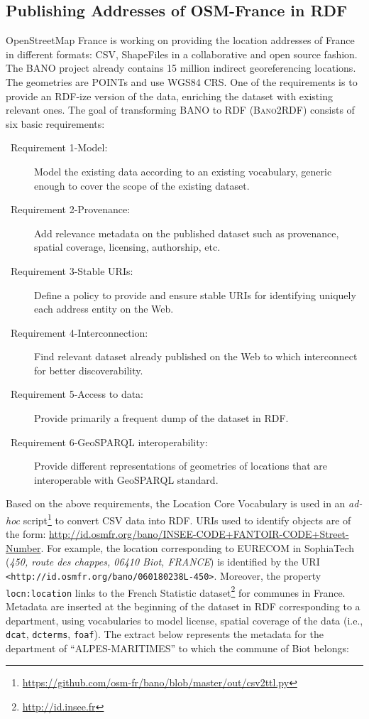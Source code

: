 \subsection{Publishing Addresses of OSM-France in RDF}
\label{sec:bano2rdf}
OpenStreetMap France is working on providing the location addresses of France in different formats: CSV, ShapeFiles in a collaborative and open source fashion. The BANO project already contains  15 million indirect georeferencing locations. The geometries are POINTs and use WGS84 CRS. One of the requirements is to provide an RDF-ize version of the data, enriching the dataset with existing relevant ones. The goal of transforming BANO to RDF (\textsc{Bano2RDF}) consists of six basic requirements:
\begin{description}
\item [~Requirement 1-Model:] Model the existing data according to an existing vocabulary, generic enough to cover the scope of the existing dataset.
\item[~Requirement 2-Provenance:] Add relevance metadata on the published dataset  such as provenance, spatial coverage, licensing, authorship, etc.
\item[~Requirement 3-Stable URIs:] Define a policy to provide and ensure stable URIs for identifying uniquely each address entity on the Web.
\item[~Requirement 4-Interconnection:] Find relevant dataset already published on the Web to which interconnect for better discoverability.

\item[~Requirement 5-Access to data:] Provide primarily a frequent dump of the dataset in RDF.

\item[~Requirement 6-GeoSPARQL interoperability:] Provide different representations of geometries of locations that are interoperable with GeoSPARQL standard.

\end{description}

Based on the above requirements, the Location Core Vocabulary \cite{locnvocab} is used in an \textit{ad-hoc} script\footnote{\url{https://github.com/osm-fr/bano/blob/master/out/csv2ttl.py}} to convert CSV data into RDF. URIs used to identify objects are of the form: \url{http://id.osmfr.org/bano/INSEE-CODE+FANTOIR-CODE+Street-Number}. For example, the location corresponding to EURECOM in SophiaTech (\textit{450, route des chappes, 06410 Biot, FRANCE}) is identified by the URI \\
\texttt{<http://id.osmfr.org/bano/060180238L-450>}. Moreover, the property \\ \texttt{locn:location} links to the French Statistic dataset\footnote{\url{http://id.insee.fr}} for communes in France. Metadata are inserted at the beginning of the dataset in RDF corresponding to a department, using vocabularies to model license, spatial coverage of the data (i.e., \texttt{dcat}, \texttt{dcterms}, \texttt{foaf}). The extract below represents the metadata for the department of ``ALPES-MARITIMES'' to which the commune of Biot belongs:

